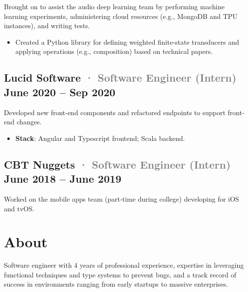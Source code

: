 \documentclass[10pt]{article} %
\providecommand{\tightlist}{%
  \setlength{\itemsep}{0pt}\setlength{\parskip}{0pt}}
\renewcommand{\emph}[1]{%
  \textcolor{gray}{#1}%
}
\begin{document}
\begin{paracol}{2}
Brought on to assist the audio deep learning team by performing machine
learning experiments, administering cloud resources (e.g., MongoDB and
TPU instances), and writing tests.

\begin{itemize}
\tightlist
\item
  Created a Python library for defining weighted finite-state
  transducers and applying operations (e.g., composition) based on
  technical papers.
\end{itemize}

\hypertarget{lucid-software-software-engineer-intern-june-2020-sep-2020}{%
\subsection{\texorpdfstring{Lucid Software \emph{· \small Software
Engineer (Intern)} \hfill \small June 2020 -- Sep
2020}{Lucid Software · Software Engineer (Intern) June 2020 -- Sep 2020}}\label{lucid-software-software-engineer-intern-june-2020-sep-2020}}

Developed new front-end components and refactored endpoints to support
front-end changes.

\begin{itemize}
\tightlist
\item
  \textbf{Stack}: Angular and Typescript frontend; Scala backend.
\end{itemize}

\hypertarget{cbt-nuggets-software-engineer-intern-june-2018-june-2019}{%
\subsection{\texorpdfstring{CBT Nuggets \emph{· \small Software Engineer
(Intern)} \hfill \small June 2018 -- June
2019}{CBT Nuggets · Software Engineer (Intern) June 2018 -- June 2019}}\label{cbt-nuggets-software-engineer-intern-june-2018-june-2019}}

Worked on the mobile apps team (part-time during college) developing for
iOS and tvOS.

\switchcolumn

\hypertarget{about}{%
\section{About}\label{about}}

Software engineer with 4 years of professional experience, expertise in
leveraging functional techniques and type systems to prevent bugs, and a
track record of success in environments ranging from early startups to
massive enterprises.


\end{paracol}
\end{document}

